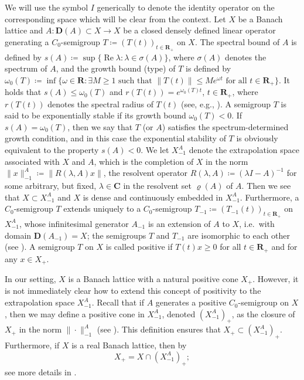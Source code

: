 \documentclass[a4paper,11pt,reqno]{amsart}
\def\la{\lambda}
\def\R{\mathbf{R}}
\def\C{\mathbf{C}}
\theoremstyle{plain}
\numberwithin{equation}{section}
\begin{document}
We will use the symbol $I$ generically to denote the identity operator on the corresponding space which will be clear from the context. Let $X$ be a Banach lattice and $A:\bm{D}({{A}})\subset X\to X$ be a closed densely defined linear operator generating a $C_0$-semigroup ${{T}}\coloneqq (T(t))_{t\in\R_+}$ on $X$. The spectral bound of ${{A}}$ is defined by $s({{A}})\coloneqq\sup\{\operatorname{Re}\lambda:\lambda\in\sigma({{A}})\}$, where $\sigma({{A}})$ denotes the spectrum of ${{A}}$, and the growth bound (type) of ${{T}}$ is defined by $\omega_0({{T}})\coloneqq\inf\{\omega\in\R:\text{$\exists M\ge 1$ such that $\|T(t)\|\le Me^{\omega t}$ for all $t\in\R_+$}\}$. It holds that $s({{A}})\le\omega_0({{T}})$ and $r(T(t))=e^{\omega_0({{T}})t}$, $t\in\R_+$, where $r(T(t))$ denotes the spectral radius of $T(t)$ (see, e.g., \cite[Proposition IV.2.2]{MR1721989}). A semigroup ${{T}}$ is said to be exponentially stable if its growth bound $\omega_0({{T}})<0$. If $s({{A}})=\omega_0({{T}})$, then we say that $T$ (or $A$) satisfies the spectrum-determined growth condition, and in this case the exponential stability of ${{T}}$ is obviously equivalent to the property $s({{A}})<0$. We let $X_{-1}^{{{A}}}$ denote the extrapolation space associated with $X$ and $A$, which is the completion of $X$ in the norm $\|x\|_{-1}^{{{A}}}\coloneqq \|R(\la,{{A}})x\|$, the resolvent operator $R(\la,{{A}})\coloneqq (\la I-{{A}})^{-1}$ for some arbitrary, but fixed, $\la\in\C$ in the resolvent set $\varrho({{A}})$ of ${{A}}$. Then we see that $X \subset X_{-1}^{{{A}}}$ and $X$ is dense and continuously embedded in $X_{-1}^{{{A}}}$. Furthermore, a $C_0$-semigroup ${{T}}$ extends uniquely to a $C_0$-semigroup ${{T}}_{-1}\coloneqq ( T_{-1}(t))_{t\in\R_+}$ on $X_{-1}^{{{A}}}$, whose infinitesimal generator ${{A}}_{-1}$ is an extension of ${{A}}$ to $X$, i.e.\ with domain $\bm{D}({{A}}_{-1})=X$; the semigroups ${{T}}$ and ${{T}}_{-1}$ are isomorphic to each other (see \cite[Section II.5]{MR1721989}). A semigroup ${{T}}$ on $X$ is called positive if $T(t)x\ge 0$ for all $t\in\R_+$ and for any $x\in X_+$. 

In our setting, $X$ is a Banach lattice with a natural positive cone $X_+$. However, it is not immediately clear how to extend this concept of positivity to the extrapolation space $X_{-1}^A$. Recall that if $A$ generates a positive $C_0$-semigroup on $X$, then we may define a positive cone in $X_{-1}^A$, denoted $(X_{-1}^A)_+$, as the closure of $X_+$ in the norm $\|\cdot\|_{-1}^{A}$ (see \cite[Definition 2.1]{MR3782646}). This definition ensures that $X_+\subset (X_{-1}^A)_+$. Furthermore, if $X$ is a real Banach lattice, then by \cite[Proposition 2.3]{MR3782646}
\begin{equation*}
X_+=X\cap (X_{-1}^{A})_+;
\end{equation*}
see more details in \cite[Section 2.2]{MR4910475}.
\end{document}
